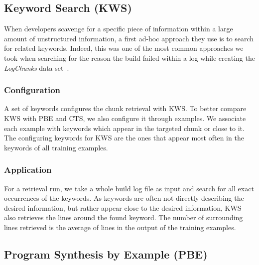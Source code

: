 \subsection{Keyword Search (KWS)}
\label{sec:expl-skws}
When developers scavenge for a specific piece of information within a
large amount of unstructured information, a first ad-hoc approach they
use is to search for related keywords. Indeed, this was one of the
most common approaches we took when searching for the reason the build
failed within a log while creating the \emph{LogChunks} data
set~\cite{brandt2020logchunks}.

\subsubsection{Configuration}
A set of keywords configures the chunk retrieval with KWS\@. To better
compare KWS with PBE and CTS, we also configure it through examples.
We associate each example with keywords which appear in the targeted
chunk or close to it. The configuring keywords for KWS are the ones
that appear most often in the keywords of all training examples.

\subsubsection{Application}
For a retrieval run, we take a whole build log file as input and
search for all exact occurrences of the keywords. As keywords are
often not directly describing the desired information, but rather
appear close to the desired information, KWS also retrieves the lines
around the found keyword. The number of surrounding lines retrieved is
the average of lines in the output of the training examples.


\subsection{Program Synthesis by Example (PBE)}
\label{sec:expl-pbe}

